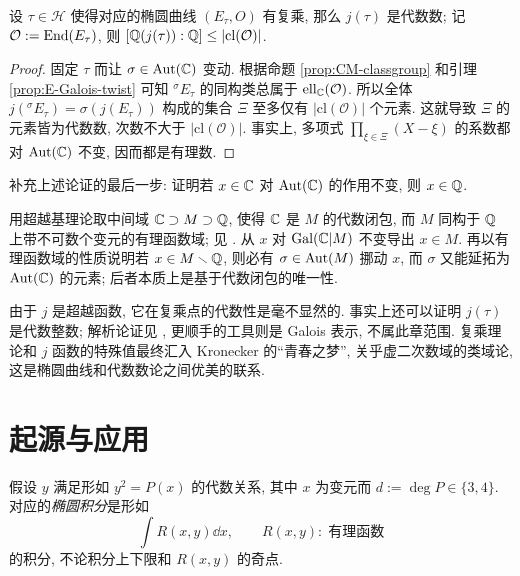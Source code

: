 \begin{theorem}
	设 $\tau \in \mathcal{H}$ 使得对应的椭圆曲线 $(E_\tau, O)$ 有复乘, 那么 $j(\tau)$ 是代数数; 记 $\mathcal{O} := \operatorname{End}(E_\tau)$, 则 $[\mathbb{Q}(j(\tau)): \mathbb{Q}] \leq \left| \mathrm{cl}(\mathcal{O}) \right|$.
\end{theorem}
\begin{proof}
	固定 $\tau$ 而让 $\sigma \in \operatorname{Aut}(\mathbb{C})$ 变动. 根据命题 \ref{prop:CM-classgroup} 和引理 \ref{prop:E-Galois-twist} 可知 ${}^\sigma E_\tau$ 的同构类总属于 $\mathrm{ell}_{\mathbb{C}}(\mathcal{O})$. 所以全体 $j\left({}^\sigma E_\tau\right) = \sigma\left(j(E_\tau)\right)$ 构成的集合 $\Xi$ 至多仅有 $\left| \mathrm{cl}(\mathcal{O}) \right|$ 个元素. 这就导致 $\Xi$ 的元素皆为代数数, 次数不大于 $\left| \mathrm{cl}(\mathcal{O}) \right|$. 事实上, 多项式 $\prod_{\xi \in \Xi} (X - \xi)$ 的系数都对 $\operatorname{Aut}(\mathbb{C})$ 不变, 因而都是有理数.
\end{proof}

\begin{exercise}
	补充上述论证的最后一步: 证明若 $x \in \mathbb{C}$ 对 $\operatorname{Aut}(\mathbb{C})$ 的作用不变, 则 $x \in \mathbb{Q}$.
	
	\begin{hint}
		用超越基理论取中间域 $\mathbb{C} \supset M \supset \mathbb{Q}$, 使得 $\mathbb{C}$ 是 $M$ 的代数闭包, 而 $M$ 同构于 $\mathbb{Q}$ 上带不可数个变元的有理函数域; 见 \cite[\S 8.8]{Li1}. 从 $x$ 对 $\operatorname{Gal}(\mathbb{C}|M)$ 不变导出 $x \in M$. 再以有理函数域的性质说明若 $x \in M \smallsetminus \mathbb{Q}$, 则必有 $\sigma \in \operatorname{Aut}(M)$ 挪动 $x$, 而 $\sigma$ 又能延拓为 $\operatorname{Aut}(\mathbb{C})$ 的元素; 后者本质上是基于代数闭包的唯一性.
	\end{hint}
\end{exercise}

由于 $j$ 是超越函数, 它在复乘点的代数性是毫不显然的. 事实上还可以证明 $j(\tau)$ 是代数整数; 解析论证见 \cite[\S 4.6]{Shi71}, 更顺手的工具则是 Galois 表示, 不属此章范围. 复乘理论和 $j$ 函数的特殊值最终汇入 Kronecker 的``青春之梦'', 关乎虚二次数域的类域论, 这是椭圆曲线和代数数论之间优美的联系.

\section{起源与应用}\label{sec:wp-application}
\begin{definition}
	假设 $y$ 满足形如 $y^2 = P(x)$ 的代数关系, 其中 $x$ 为变元而 $d := \deg P \in \{3, 4\}$. 对应的\emph{椭圆积分}是形如
	\[ \int R(x,y) \dd x, \qquad R(x,y):\; \text{有理函数} \]
	的积分, 不论积分上下限和 $R(x,y)$ 的奇点.
\end{definition}

